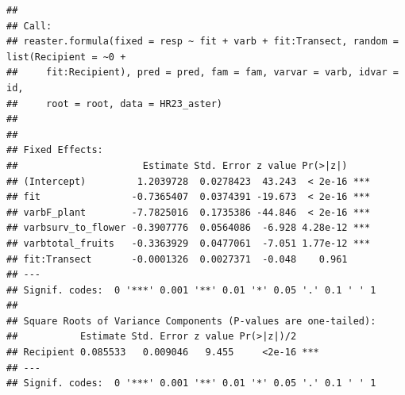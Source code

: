\documentclass[
]{article}
\begin{document}
\begin{verbatim}
## 
## Call:
## reaster.formula(fixed = resp ~ fit + varb + fit:Transect, random = list(Recipient = ~0 + 
##     fit:Recipient), pred = pred, fam = fam, varvar = varb, idvar = id, 
##     root = root, data = HR23_aster)
## 
## 
## Fixed Effects:
##                      Estimate Std. Error z value Pr(>|z|)    
## (Intercept)         1.2039728  0.0278423  43.243  < 2e-16 ***
## fit                -0.7365407  0.0374391 -19.673  < 2e-16 ***
## varbF_plant        -7.7825016  0.1735386 -44.846  < 2e-16 ***
## varbsurv_to_flower -0.3907776  0.0564086  -6.928 4.28e-12 ***
## varbtotal_fruits   -0.3363929  0.0477061  -7.051 1.77e-12 ***
## fit:Transect       -0.0001326  0.0027371  -0.048    0.961    
## ---
## Signif. codes:  0 '***' 0.001 '**' 0.01 '*' 0.05 '.' 0.1 ' ' 1
## 
## Square Roots of Variance Components (P-values are one-tailed):
##           Estimate Std. Error z value Pr(>|z|)/2    
## Recipient 0.085533   0.009046   9.455     <2e-16 ***
## ---
## Signif. codes:  0 '***' 0.001 '**' 0.01 '*' 0.05 '.' 0.1 ' ' 1
\end{verbatim}
\end{document}
